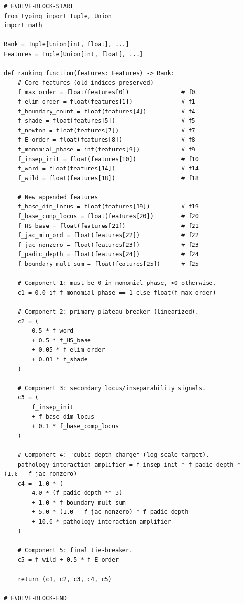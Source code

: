 \documentclass[11pt]{amsart}
\begin{document}
\begin{verbatim}
# EVOLVE-BLOCK-START
from typing import Tuple, Union
import math

Rank = Tuple[Union[int, float], ...]
Features = Tuple[Union[int, float], ...]

def ranking_function(features: Features) -> Rank:
    # Core features (old indices preserved)
    f_max_order = float(features[0])               # f0
    f_elim_order = float(features[1])              # f1
    f_boundary_count = float(features[4])          # f4
    f_shade = float(features[5])                   # f5
    f_newton = float(features[7])                  # f7
    f_E_order = float(features[8])                 # f8
    f_monomial_phase = int(features[9])            # f9
    f_insep_init = float(features[10])             # f10
    f_word = float(features[14])                   # f14
    f_wild = float(features[18])                   # f18

    # New appended features
    f_base_dim_locus = float(features[19])         # f19
    f_base_comp_locus = float(features[20])        # f20
    f_HS_base = float(features[21])                # f21
    f_jac_min_ord = float(features[22])            # f22
    f_jac_nonzero = float(features[23])            # f23
    f_padic_depth = float(features[24])            # f24
    f_boundary_mult_sum = float(features[25])      # f25

    # Component 1: must be 0 in monomial phase, >0 otherwise.
    c1 = 0.0 if f_monomial_phase == 1 else float(f_max_order)

    # Component 2: primary plateau breaker (linearized).
    c2 = (
        0.5 * f_word
        + 0.5 * f_HS_base
        + 0.05 * f_elim_order
        + 0.01 * f_shade
    )

    # Component 3: secondary locus/inseparability signals.
    c3 = (
        f_insep_init
        + f_base_dim_locus
        + 0.1 * f_base_comp_locus
    )

    # Component 4: "cubic depth charge" (log-scale target).
    pathology_interaction_amplifier = f_insep_init * f_padic_depth * (1.0 - f_jac_nonzero)
    c4 = -1.0 * (
        4.0 * (f_padic_depth ** 3)
        + 1.0 * f_boundary_mult_sum
        + 5.0 * (1.0 - f_jac_nonzero) * f_padic_depth
        + 10.0 * pathology_interaction_amplifier
    )

    # Component 5: final tie-breaker.
    c5 = f_wild + 0.5 * f_E_order

    return (c1, c2, c3, c4, c5)

# EVOLVE-BLOCK-END
\end{verbatim}
\end{document}
